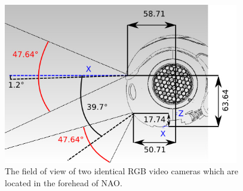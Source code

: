 \begin{figure}
	[h] \centering 
	\includegraphics[height=7cm]{figures/content/nao-vision.jpg} \caption{The field of view of two identical RGB video cameras which are located in the forehead of NAO. \cite{8} } \label{fg:nao:vision} 
\end{figure}
